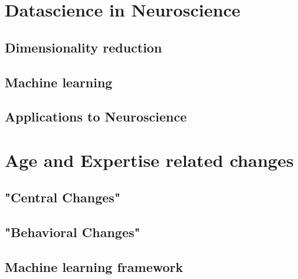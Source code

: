 \section{Datascience in Neuroscience}
	\subsection{Dimensionality reduction}
	\subsection{Machine learning}
	\subsection{Applications to Neuroscience}
\section{Age and Expertise related changes}
	\subsection{"Central Changes"}
	\subsection{"Behavioral Changes"}
	\subsection{Machine learning framework}